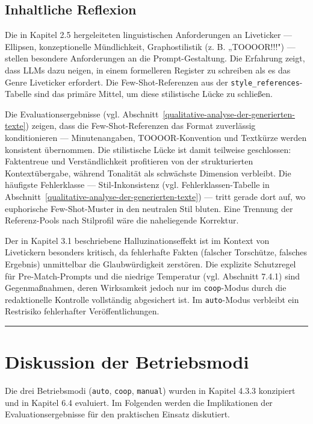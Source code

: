 \subsection{Inhaltliche Reflexion}\label{inhaltliche-reflexion}

Die in Kapitel 2.5 hergeleiteten linguistischen Anforderungen an
Liveticker --- Ellipsen, konzeptionelle Mündlichkeit, Graphostilistik
(z. B. „TOOOOR!!!") --- stellen besondere Anforderungen an die
Prompt-Gestaltung. Die Erfahrung zeigt, dass LLMs dazu neigen, in einem
formelleren Register zu schreiben als es das Genre Liveticker erfordert.
Die Few-Shot-Referenzen aus der \texttt{style\_references}-Tabelle sind
das primäre Mittel, um diese stilistische Lücke zu schließen.

Die Evaluationsergebnisse (vgl. Abschnitt~\ref{qualitative-analyse-der-generierten-texte}) zeigen, dass die
Few-Shot-Referenzen das Format zuverlässig konditionieren ---
Minutenangaben, TOOOOR-Konvention und Textkürze werden konsistent
übernommen. Die stilistische Lücke ist damit teilweise geschlossen:
Faktentreue und Verständlichkeit profitieren von der strukturierten
Kontextübergabe, während Tonalität als schwächste Dimension verbleibt.
Die häufigste Fehlerklasse --- Stil-Inkonsistenz (vgl.
Fehlerklassen-Tabelle in Abschnitt~\ref{qualitative-analyse-der-generierten-texte}) --- tritt gerade dort auf, wo
euphorische Few-Shot-Muster in den neutralen Stil bluten. Eine Trennung
der Referenz-Pools nach Stilprofil wäre die naheliegende Korrektur.

Der in Kapitel 3.1 beschriebene Halluzinationseffekt ist im Kontext von
Livetickern besonders kritisch, da fehlerhafte Fakten (falscher
Torschütze, falsches Ergebnis) unmittelbar die Glaubwürdigkeit
zerstören. Die explizite Schutzregel für Pre-Match-Prompts und die
niedrige Temperatur (vgl. Abschnitt 7.4.1) sind Gegenmaßnahmen, deren
Wirksamkeit jedoch nur im \texttt{coop}-Modus durch die redaktionelle
Kontrolle vollständig abgesichert ist. Im \texttt{auto}-Modus verbleibt
ein Restrisiko fehlerhafter Veröffentlichungen.

\begin{center}\rule{0.5\linewidth}{0.5pt}\end{center}

\section{Diskussion der Betriebsmodi}\label{diskussion-der-betriebsmodi}

Die drei Betriebsmodi (\texttt{auto}, \texttt{coop}, \texttt{manual})
wurden in Kapitel 4.3.3 konzipiert und in Kapitel 6.4 evaluiert. Im
Folgenden werden die Implikationen der Evaluationsergebnisse für den
praktischen Einsatz diskutiert.

